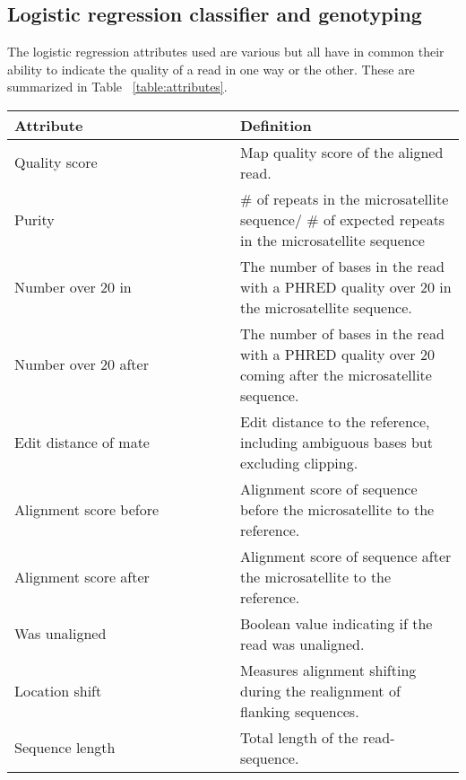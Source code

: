 \documentclass{bioinfo}
\begin{document}
\subsection{Logistic regression classifier and genotyping}
    The logistic regression attributes used are various but all have in common their ability to indicate the quality of a read in one way or the other. These are summarized in Table ~\ref{table:attributes}. 

    \begin{table*}[ht]
        \caption{The attributes used as control variables in the Logistic regression classification.}
        \begin{tabular}{p{0.5\linewidth}|p{0.5\linewidth}}
            \hline
            \textbf{Attribute} & \textbf{Definition} \\ \hline
            Quality score & Map quality score of the aligned read. \\ \hline
            Purity & \# of repeats in the microsatellite sequence/ 
            \# of expected repeats in the microsatellite sequence \\ \hline
            Number over 20 in & The number of bases in the read with a PHRED quality over 20 in the microsatellite sequence. \\ \hline
            Number over 20 after & The number of bases in the read with a PHRED quality over 20 coming after the microsatellite sequence. \\ \hline
            Edit distance of mate & Edit distance to the reference, including ambiguous bases but excluding clipping. \\ \hline
            Alignment score before & Alignment score of sequence before the microsatellite to the reference. \\ \hline
            Alignment score after & Alignment score of sequence after the microsatellite to the reference. \\ \hline
            Was unaligned & Boolean value indicating if the read was unaligned. \\ \hline
            Location shift & Measures alignment shifting during the realignment of flanking sequences. \\ \hline
            Sequence length & Total length of the read-sequence. \\
            \hline
        \end{tabular}
        \label{table:attributes}
    \end{table*}
    
\end{document}
